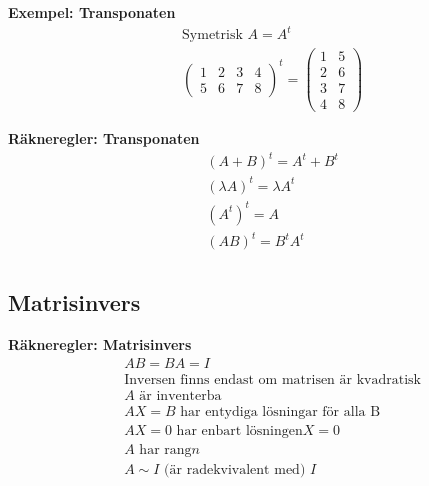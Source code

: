 \textbf{Exempel: Transponaten}
\begin{align*}
  &\quad  \text{Symetrisk } A=A^t \\
  &\quad
  \left(\begin{array}{cccc}
    1 & 2 & 3 & 4 \\
    5 & 6 & 7 & 8
  \end{array}\right)^t =
  \left(\begin{array}{cc}
    1 & 5 \\
    2 & 6 \\
    3 & 7 \\
    4 & 8
  \end{array}\right)
\end{align*}

\textbf{Räkneregler: Transponaten}
\begin{align*}
  &\quad  {(A+B)}^t = A^t+B^t \\
  &\quad  {(\lambda A)}^t = \lambda A^t \\
  &\quad  {(A^t)}^t = A \\
  &\quad  {(AB)}^t = B^t A^t \\
\end{align*}


\subsection{Matrisinvers}
\textbf{Räkneregler: Matrisinvers }
\begin{align*}
  &\quad  AB=BA=I \\
  &\quad  \text{Inversen finns endast om matrisen är kvadratisk} \\
  &\quad  A \text{ är inventerba} \\
  &\quad  AX=B \text{ har entydiga lösningar för alla B} \\
  &\quad  AX=0 \text{ har enbart lösningen} X=0 \\
  &\quad  A \text{ har rang} n \\
  &\quad  A \sim I  \text{ (är radekvivalent med) } I
\end{align*}

